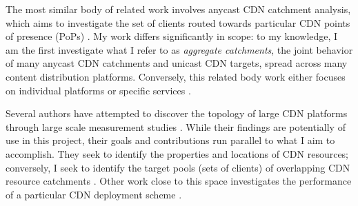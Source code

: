 The most similar body of related work involves anycast CDN catchment analysis, which aims to
investigate the set of clients routed towards particular CDN points of presence (PoPs)
\cite{Calder2015, anycastvsddos, vdmscatchment}. My work differs significantly in scope: to my
knowledge, I am the first investigate what I refer to as \emph{aggregate catchments}, the joint
behavior of many anycast CDN catchments and unicast CDN targets, spread across many content
distribution platforms. Conversely, this related body work either focuses on individual platforms or
specific services \cite{Calder2015, anycastvsddos, vdmscatchment}. 

Several authors have attempted to discover the topology of large CDN platforms through large scale
measurement studies \cite{webcart, Calder2013, benson11}. While their findings are potentially of
use in this project, their goals and contributions run parallel to what I aim to accomplish. They
seek to identify the properties and locations of CDN resources; conversely, I seek to identify the
target pools (sets of clients) of overlapping CDN resource catchments \cite{webcart, Calder2013,
benson11}. Other work close to this space investigates the performance of a particular CDN
deployment scheme \cite{ecs15sigcomm}.
